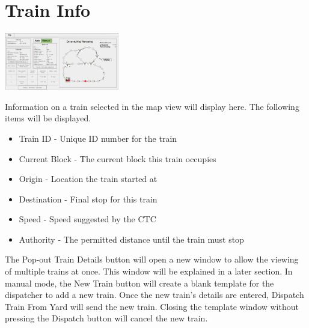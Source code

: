 \documentclass{scrreprt}
\begin{document}
\section{Train Info}
\begin{center}
  \includegraphics[trim={.45cm 6.6cm 27.45cm 4.6cm},clip,width=5cm]{CTC-main}
\end{center}
Information on a train selected in the map view will display here. The following items
will be displayed.
\begin{itemize}
  \item Train ID - Unique ID number for the train
  \item Current Block - The current block this train occupies
  \item Origin - Location the train started at
  \item Destination - Final stop for this train
  \item Speed - Speed suggested by the CTC
  \item Authority - The permitted distance until the train must stop
\end{itemize}
The Pop-out Train Details button will open a new window to allow the viewing of multiple
trains at once. This window will be explained in a later section. In manual mode, the New
Train button will create a blank template for the dispatcher to add a new train. Once the
new train's details are entered, Dispatch Train From Yard will send the new train. Closing
the template window without pressing the Dispatch button will cancel the new train.
\end{document}
